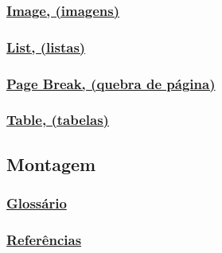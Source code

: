 \subsubsection{\underline{Image, (imagens)}}

\subsubsection{\underline{List, (listas)}}

\subsubsection{\underline{Page Break, (quebra de página)}}

\subsubsection{\underline{Table, (tabelas)}}

\subsection{Montagem}

\subsubsection{\underline{Glossário}}

\subsubsection{\underline{Referências}}